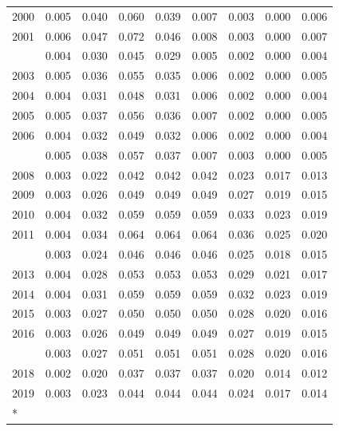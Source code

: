 \documentclass[
]{article}
\begin{document}
\begin{longtable}[t]{lrrrrrrrr}
2000 & 0.005 & 0.040 & 0.060 & 0.039 & 0.007 & 0.003 & 0.000 & 0.006\\
2001 & 0.006 & 0.047 & 0.072 & 0.046 & 0.008 & 0.003 & 0.000 & 0.007\\
\addlinespace
2002 & 0.004 & 0.030 & 0.045 & 0.029 & 0.005 & 0.002 & 0.000 & 0.004\\
2003 & 0.005 & 0.036 & 0.055 & 0.035 & 0.006 & 0.002 & 0.000 & 0.005\\
2004 & 0.004 & 0.031 & 0.048 & 0.031 & 0.006 & 0.002 & 0.000 & 0.004\\
2005 & 0.005 & 0.037 & 0.056 & 0.036 & 0.007 & 0.002 & 0.000 & 0.005\\
2006 & 0.004 & 0.032 & 0.049 & 0.032 & 0.006 & 0.002 & 0.000 & 0.004\\
\addlinespace
2007 & 0.005 & 0.038 & 0.057 & 0.037 & 0.007 & 0.003 & 0.000 & 0.005\\
2008 & 0.003 & 0.022 & 0.042 & 0.042 & 0.042 & 0.023 & 0.017 & 0.013\\
2009 & 0.003 & 0.026 & 0.049 & 0.049 & 0.049 & 0.027 & 0.019 & 0.015\\
2010 & 0.004 & 0.032 & 0.059 & 0.059 & 0.059 & 0.033 & 0.023 & 0.019\\
2011 & 0.004 & 0.034 & 0.064 & 0.064 & 0.064 & 0.036 & 0.025 & 0.020\\
\addlinespace
2012 & 0.003 & 0.024 & 0.046 & 0.046 & 0.046 & 0.025 & 0.018 & 0.015\\
2013 & 0.004 & 0.028 & 0.053 & 0.053 & 0.053 & 0.029 & 0.021 & 0.017\\
2014 & 0.004 & 0.031 & 0.059 & 0.059 & 0.059 & 0.032 & 0.023 & 0.019\\
2015 & 0.003 & 0.027 & 0.050 & 0.050 & 0.050 & 0.028 & 0.020 & 0.016\\
2016 & 0.003 & 0.026 & 0.049 & 0.049 & 0.049 & 0.027 & 0.019 & 0.015\\
\addlinespace
2017 & 0.003 & 0.027 & 0.051 & 0.051 & 0.051 & 0.028 & 0.020 & 0.016\\
2018 & 0.002 & 0.020 & 0.037 & 0.037 & 0.037 & 0.020 & 0.014 & 0.012\\
2019 & 0.003 & 0.023 & 0.044 & 0.044 & 0.044 & 0.024 & 0.017 & 0.014\\*
\end{longtable}
\end{document}
